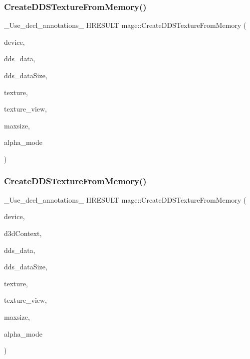 \subsubsection{\texorpdfstring{Create\+D\+D\+S\+Texture\+From\+Memory()}{CreateDDSTextureFromMemory()}\hspace{0.1cm}{\footnotesize\ttfamily [3/4]}}
{\footnotesize\ttfamily \+\_\+\+Use\+\_\+decl\+\_\+annotations\+\_\+ H\+R\+E\+S\+U\+LT mage\+::\+Create\+D\+D\+S\+Texture\+From\+Memory (\begin{DoxyParamCaption}\item[{\hyperlink{namespacemage_ae74f374780900893caa5555d1031fd79}{Com\+Ptr}$<$ I\+D3\+D11\+Device2 $>$}]{device,  }\item[{const uint8\+\_\+t $\ast$}]{dds\+\_\+data,  }\item[{size\+\_\+t}]{dds\+\_\+data\+Size,  }\item[{I\+D3\+D11\+Resource $\ast$$\ast$}]{texture,  }\item[{I\+D3\+D11\+Shader\+Resource\+View $\ast$$\ast$}]{texture\+\_\+view,  }\item[{size\+\_\+t}]{maxsize,  }\item[{\hyperlink{namespacemage_a0c586a2bad862f4858900ca121ca80c2}{D\+D\+S\+\_\+\+A\+L\+P\+H\+A\+\_\+\+M\+O\+DE} $\ast$}]{alpha\+\_\+mode }\end{DoxyParamCaption})}

\hypertarget{namespacemage_adafc0afa58614314add12184fb81740b}{}\label{namespacemage_adafc0afa58614314add12184fb81740b} 
\subsubsection{\texorpdfstring{Create\+D\+D\+S\+Texture\+From\+Memory()}{CreateDDSTextureFromMemory()}\hspace{0.1cm}{\footnotesize\ttfamily [4/4]}}
{\footnotesize\ttfamily \+\_\+\+Use\+\_\+decl\+\_\+annotations\+\_\+ H\+R\+E\+S\+U\+LT mage\+::\+Create\+D\+D\+S\+Texture\+From\+Memory (\begin{DoxyParamCaption}\item[{\hyperlink{namespacemage_ae74f374780900893caa5555d1031fd79}{Com\+Ptr}$<$ I\+D3\+D11\+Device2 $>$}]{device,  }\item[{I\+D3\+D11\+Device\+Context $\ast$}]{d3d\+Context,  }\item[{const uint8\+\_\+t $\ast$}]{dds\+\_\+data,  }\item[{size\+\_\+t}]{dds\+\_\+data\+Size,  }\item[{I\+D3\+D11\+Resource $\ast$$\ast$}]{texture,  }\item[{I\+D3\+D11\+Shader\+Resource\+View $\ast$$\ast$}]{texture\+\_\+view,  }\item[{size\+\_\+t}]{maxsize,  }\item[{\hyperlink{namespacemage_a0c586a2bad862f4858900ca121ca80c2}{D\+D\+S\+\_\+\+A\+L\+P\+H\+A\+\_\+\+M\+O\+DE} $\ast$}]{alpha\+\_\+mode }\end{DoxyParamCaption})}

